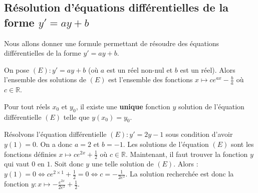 	\subsection{Résolution d'équations différentielles de la forme \texorpdfstring{$y'=ay+b$}{y'=ay+b}}
	
	Nous allons donner une formule permettant de résoudre des équations différentielles de la forme $y' = ay+b$.
	
	\begin{formula}[Formule]
		On pose $(E) : y'=ay+b$ (où $a$ est un réel non-nul et $b$ est un réel). Alors l'ensemble des solutions de $(E)$ est l'ensemble des fonctions $x \mapsto c e^{ax} - \frac{b}{a}$ où $c \in \mathbb{R}$.
	\end{formula}
	
	\begin{formula}[Théorème]
		Pour tout réels $x_0$ et $y_0$, il existe une \textbf{unique} fonction $y$ solution de l'équation différentielle $(E)$ telle que $y(x_0) = y_0$.
	\end{formula}
	
	\begin{tip}[Exemple]
		Résolvons l'équation différentielle $(E) : y'=2y-1$ sous condition d'avoir $y(1) = 0$.
		\newpar
		On a donc $a = 2$ et $b = -1$. Les solutions de l'équation $(E)$ sont les fonctions définies $x \mapsto c e^{2x} + \frac{1}{2}$ où $c \in \mathbb{R}$.
		\newpar
		Maintenant, il faut trouver la fonction $y$ qui vaut $0$ en $1$. Soit donc $y$ une telle solution de $(E)$. Alors :
		\newpar
		$y(1) =  0 \iff c e^{2 \times 1} + \frac{1}{2} = 0 \iff c = -\frac{1}{2e^2}$. La solution recherchée est donc la fonction $y : x \mapsto -\frac{e^{2x}}{2e^2} + \frac{1}{2}$.
	\end{tip}

